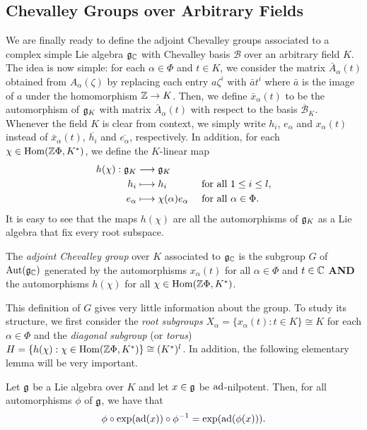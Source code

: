 \subsection{Chevalley Groups over Arbitrary Fields}

We are finally ready to define the adjoint Chevalley groups associated to a complex simple Lie algebra $\mathfrak{g}_{\mathbb{C}}$ with Chevalley basis $\mathcal{B}$ over an arbitrary field $K$. 
The idea is now simple: for each $\alpha\in\Phi$ and $t\in K$, we consider the matrix $\bar{A}_\alpha(t)$ obtained from $A_\alpha(\zeta)$ by replacing each entry $a\zeta^i$ with $\bar{a}t^i$ where $\bar{a}$ is the image of $a$ under the homomorphism $\mathbb{Z}\to K$. 
Then, we define $\bar{x}_\alpha(t)$ to be the automorphism of $\mathfrak{g}_K$ with matrix $\bar{A}_\alpha(t)$ with respect to the basis $\overline{\mathcal{B}}_K$. Whenever the field $K$ is clear from context, we simply write $h_i$, $e_\alpha$ and $x_\alpha(t)$ instead of $\bar{x}_\alpha(t)$, $\overline{h_i}$ and $\overline{e_\alpha}$, respectively. In addition, for each $\chi\in\mathrm{Hom}(\mathbb{Z}\Phi,K^*)$, we define the $K$-linear map
\begin{align*}
    h(\chi):\mathfrak{g}_K& \longrightarrow\mathfrak{g}_K\\
    h_i & \longmapsto h_i\hspace{1.23cm} \text{for all } 1\leq i \leq l,\\
    e_\alpha & \longmapsto \chi(\alpha) e_\alpha \quad\text{ for all } \alpha\in\Phi.
\end{align*}
It is easy to see that the maps $h(\chi)$ are all the automorphisms of $\mathfrak{g}_K$ as a Lie algebra that fix every root subspace.

\begin{definition}\label{def:chevgroup}
    The \textit{adjoint Chevalley group} over $K$ associated to $\mathfrak{g}_{\mathbb{C}}$ is the subgroup $G$ of $\mathrm{Aut}(\mathfrak{g}_{\mathbb{C}})$ generated by the automorphisms $x_\alpha(t)$ for all $\alpha\in\Phi$ and $t\in\mathbb{C}$ \textbf{AND} the automorphisms $h(\chi)$ for all $\chi\in\mathrm{Hom}(\mathbb{Z}\Phi, K^*)$.
\end{definition}

This definition of $G$ gives very little information about the group. To study its structure, we first consider the \textit{root subgroups} $X_\alpha=\{x_\alpha(t):t\in K\}\cong K$ for each $\alpha\in\Phi$ and the \textit{diagonal subgroup} (or \textit{torus}) $H=\{h(\chi):\chi\in\mathrm{Hom}(\mathbb{Z}\Phi,K^*)\}\cong (K^*)^l$. In addition, the following elementary lemma will be very important. 

\begin{lemma}\label{lem:conjxalpla}
    Let $\mathfrak{g}$ be a Lie algebra over $K$ and let $x\in\mathfrak{g}$ be $\mathrm{ad}$-nilpotent. Then, for all automorphisms $\phi$ of $\mathfrak{g}$, we have that 
    $$\phi\circ\exp(\mathrm{ad}(x))\circ\phi^{-1}=\exp(\mathrm{ad}(\phi(x))).$$
\end{lemma}

